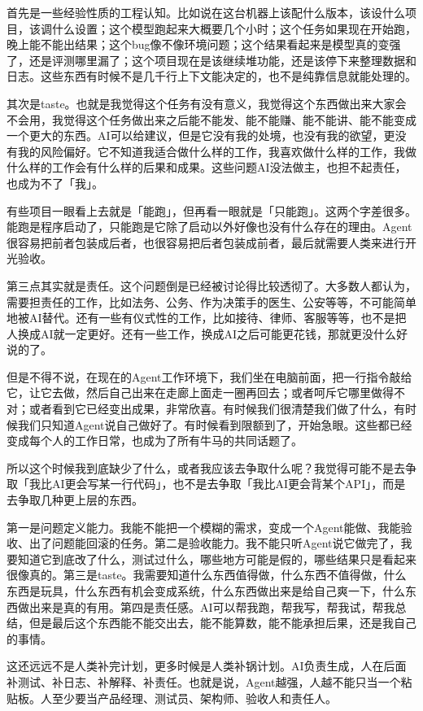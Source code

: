 首先是一些经验性质的工程认知。比如说在这台机器上该配什么版本，该设什么项目，该调什么设置；这个模型跑起来大概要几个小时；这个任务如果现在开始跑，晚上能不能出结果；这个bug像不像环境问题；这个结果看起来是模型真的变强了，还是评测哪里漏了；这个项目现在是该继续堆功能，还是该停下来整理数据和日志。这些东西有时候不是几千行上下文能决定的，也不是纯靠信息就能处理的。

其次是taste。也就是我觉得这个任务有没有意义，我觉得这个东西做出来大家会不会用，我觉得这个任务做出来之后能不能发、能不能赚、能不能讲、能不能变成一个更大的东西。AI可以给建议，但是它没有我的处境，也没有我的欲望，更没有我的风险偏好。它不知道我适合做什么样的工作，我喜欢做什么样的工作，我做什么样的工作会有什么样的后果和成果。这些问题AI没法做主，也担不起责任，也成为不了「我」。

有些项目一眼看上去就是「能跑」，但再看一眼就是「只能跑」。这两个字差很多。能跑是程序启动了，只能跑是它除了启动以外好像也没有什么存在的理由。Agent很容易把前者包装成后者，也很容易把后者包装成前者，最后就需要人类来进行开光验收。

第三点其实就是责任。这个问题倒是已经被讨论得比较透彻了。大多数人都认为，需要担责任的工作，比如法务、公务、作为决策手的医生、公安等等，不可能简单地被AI替代。还有一些有仪式性的工作，比如接待、律师、客服等等，也不是把人换成AI就一定更好。还有一些工作，换成AI之后可能更花钱，那就更没什么好说的了。

但是不得不说，在现在的Agent工作环境下，我们坐在电脑前面，把一行指令敲给它，让它去做，然后自己出来在走廊上面走一圈再回去；或者呵斥它哪里做得不对；或者看到它已经变出成果，非常欣喜。有时候我们很清楚我们做了什么，有时候我们只知道Agent说自己做好了。有时候看到限额到了，开始急眼。这些都已经变成每个人的工作日常，也成为了所有牛马的共同话题了。

所以这个时候我到底缺少了什么，或者我应该去争取什么呢？我觉得可能不是去争取「我比AI更会写某一行代码」，也不是去争取「我比AI更会背某个API」，而是去争取几种更上层的东西。

第一是问题定义能力。我能不能把一个模糊的需求，变成一个Agent能做、我能验收、出了问题能回滚的任务。第二是验收能力。我不能只听Agent说它做完了，我要知道它到底改了什么，测试过什么，哪些地方可能是假的，哪些结果只是看起来很像真的。第三是taste。我需要知道什么东西值得做，什么东西不值得做，什么东西是玩具，什么东西有机会变成系统，什么东西做出来是给自己爽一下，什么东西做出来是真的有用。第四是责任感。AI可以帮我跑，帮我写，帮我试，帮我总结，但是最后这个东西能不能交出去，能不能算数，能不能承担后果，还是我自己的事情。

这还远远不是人类补完计划，更多时候是人类补锅计划。AI负责生成，人在后面补测试、补日志、补解释、补责任。也就是说，Agent越强，人越不能只当一个粘贴板。人至少要当产品经理、测试员、架构师、验收人和责任人。

